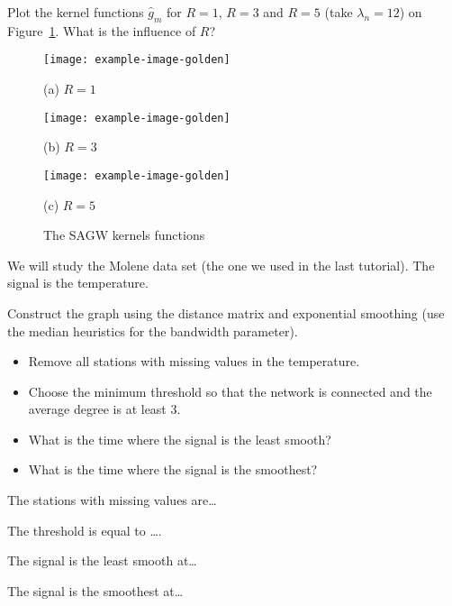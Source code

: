 \documentclass[11pt]{article}
\begin{document}
\begin{exercise}
Plot the kernel functions $\hat{g}_m$ for $R=1$, $R=3$ and $R=5$ (take $\lambda_n=12$) on Figure~\ref{fig:sagw-kernels}. What is the influence of $R$?
\end{exercise}

\begin{solution}
\begin{figure}
    \centering
    \begin{minipage}[t]{0.32\textwidth}
    \centerline{\texttt{[image: example-image-golden]}}
    \centerline{(a) $R=1$}
    \end{minipage}
    \hfill
    \begin{minipage}[t]{0.32\textwidth}    \centerline{\texttt{[image: example-image-golden]}}
    \centerline{(b) $R=3$}
    \end{minipage}
    \hfill
    \begin{minipage}[t]{0.32\textwidth}    \centerline{\texttt{[image: example-image-golden]}}
    \centerline{(c) $R=5$}
    \end{minipage}
    \caption{The SAGW kernels functions}\label{fig:sagw-kernels}
\end{figure}
\end{solution}


\newpage
We will study the Molene data set (the one we used in the last tutorial).
The signal is the temperature.

\begin{exercise}
Construct the graph using the distance matrix and exponential smoothing (use the median heuristics for the bandwidth parameter). 
\begin{itemize}
    \item Remove all stations with missing values in the temperature.
    \item Choose the minimum threshold so that the network is connected and the average degree is at least 3.
    \item What is the time where the signal is the least smooth?
    \item What is the time where the signal is the smoothest?
\end{itemize}
\end{exercise}

\begin{solution}
The stations with missing values are\dots

The threshold is equal to \dots.

The signal is the least smooth at\dots

The signal is the smoothest at\dots

\end{solution}
\end{document}
